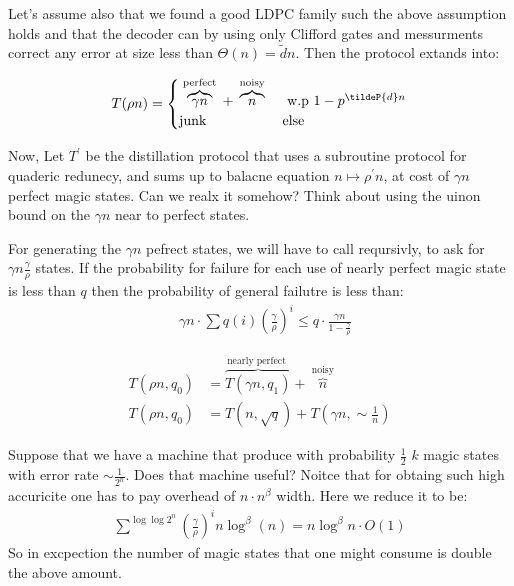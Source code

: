 Let's assume also that we found a good LDPC family such the above assumption
holds and that the decoder can by using only Clifford gates and messurments
correct any error at size less than $\Theta(n)=\tilde{d}n$. Then the protocol
extands into:

\begin{equation*}
  \begin{split}
    T(\rho n) =
    \begin{cases}
      \overbrace{\gamma n}^{\text{ perfect }} +\overbrace{n}^{\text{ noisy }}
      & \text{ w.p }  1 - p^{\tildeP{d}n}  \\
      \text{junk} & \text{else}
    \end{cases}
  \end{split}
\end{equation*}

Now, Let $T^{\prime}$ be the distillation protocol that uses a subroutine
protocol for quaderic redunecy, and sums up to balacne equation $n \mapsto
\rho^{\prime} n$, at cost of $\gamma n$ perfect magic states. Can we realx it
somehow? Think about using the uinon bound on the $\gamma n$ near to perfect
states.

For generating the $\gamma n$ pefrect states, we will have to call reqursivly,
to ask for $\gamma n \frac{\gamma}{\rho}$ states. If the probability for
failure for each use of nearly perfect magic state is less than $q$ then the
probability of general failutre is less than:
\begin{equation*}
  \begin{split}
    & \gamma n \cdot \sum q(i) \left( \frac{\gamma}{\rho} \right)^{i} \le  q
    \cdot \frac{\gamma n }{ 1 - \frac{\gamma}{\rho}}
  \end{split}
\end{equation*}

\begin{equation*}
  \begin{split}
    T(\rho n, q_{0}) & = \overbrace{T(\gamma n, q_{1})}^{\text{nearly perfect
    }} +\overbrace{n}^{\text{ noisy }}   \\
    T(\rho n, q_{0}) &= T(n, \sqrt{q}) + T(\gamma n, \sim \frac{1}{n})
  \end{split}
\end{equation*}

Suppose that we have a machine that produce with probability $\frac{1}{2}$ $k$
magic states with error rate $\sim \frac{1}{2^{n}}$. Does that machine useful?
Noitce that for obtaing such high accuricite one has to pay overhead of
$n\cdot n^{\beta}$ width. Here we reduce it to be:
\begin{equation*}
  \begin{split}
    \sum^{\log \log 2^n}{ \left(\frac{\gamma}{\rho}\right)^{i} n  \log^{\beta}
    \left( n \right)} = n \log^{\beta} n \cdot O(1)
  \end{split}
\end{equation*}
So in excpection the number of magic states that one might consume is double
the above amount.

